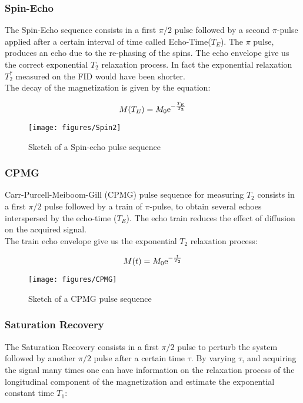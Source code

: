 \documentclass[a4paper,11pt]{report}
\begin{document}
	\subsubsection{Spin-Echo} \label{spinecho}
	 The Spin-Echo sequence consists in a first $\pi/2$ pulse followed by a second $\pi$-pulse applied after a certain interval of time called Echo-Time($T_E$). The $\pi$ pulse, produces an echo due to the re-phasing of the spins. The echo envelope give us the correct exponential $T_2$ relaxation process. In fact the exponential relaxation $T_{2}^*$ measured on the FID would have been shorter.\\ The decay of the magnetization is given by the equation:
         
         \begin{equation}
         	\large{M(T_E)=M_0\mathrm{e}^{- \frac{T_E}{T_2}}}
         \end{equation}
         \begin{figure}[h]
      	\centering
      	\texttt{[image: figures/Spin2]}
      	\caption{Sketch of a Spin-echo pulse sequence}\label{Spinecho}
      \end{figure}
      \subsubsection{CPMG} 
      Carr-Purcell-Meiboom-Gill (CPMG) pulse sequence for measuring $T_2$ consists in a first $\pi/2$ pulse followed by a train of $\pi$-pulse, to obtain several echoes interspersed by the echo-time ($T_E$). The echo train reduces the effect of diffusion on the acquired signal. \\The train echo envelope give us the exponential $T_2$ relaxation process: 
       
      \begin{equation}
      	\large{M(t)= M_0 \mathrm{e}^{- \frac{t}{T_2}}}
      \end{equation}
      
      \begin{figure}[h]
      	\centering
      	\texttt{[image: figures/CPMG]}
      	\caption{Sketch of a CPMG pulse sequence}\label{CPMG}
      \end{figure}
      
      
      
      
      \subsubsection{Saturation Recovery}
      The Saturation Recovery consists in a first $\pi/2$ pulse to perturb the system followed by another $\pi/2$ pulse after a certain time $\tau$.  By varying $\tau$, and acquiring the signal many times one can have information on the relaxation process  of the longitudinal component of the magnetization and estimate the exponential constant time $T_1$:   
\end{document}
